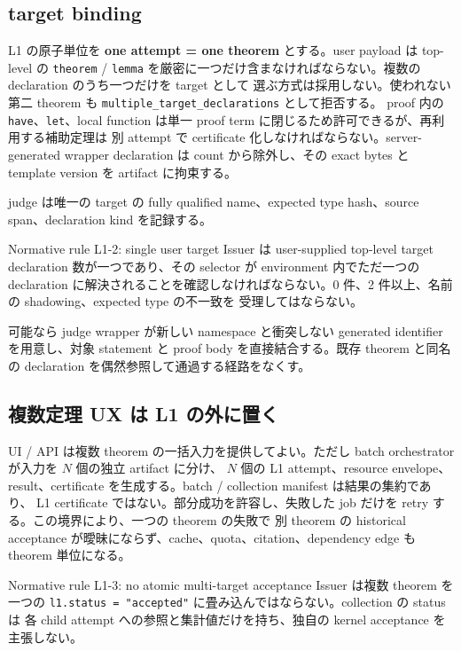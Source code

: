 \documentclass[a4paper,11pt]{ltjsarticle}
\newcommand{\term}[1]{\textbf{\color{TFNavy}#1}}
\newcommand{\code}[1]{\texttt{#1}}
\begin{document}
\subsection{target binding}

L1 の原子単位を \term{one attempt = one theorem} とする。user payload は top-level の
\code{theorem} / \code{lemma} を厳密に一つだけ含まなければならない。複数の declaration のうち一つだけを target として
選ぶ方式は採用しない。使われない第二 theorem も \code{multiple\_target\_declarations} として拒否する。
proof 内の \code{have}、\code{let}、local function は単一 proof term に閉じるため許可できるが、再利用する補助定理は
別 attempt で certificate 化しなければならない。server-generated wrapper declaration は count から除外し、その exact
bytes と template version を artifact に拘束する。

judge は唯一の target の fully qualified name、expected type hash、source span、declaration kind を記録する。

\begin{specbox}{Normative rule L1-2: single user target}
Issuer は user-supplied top-level target declaration 数が一つであり、その selector が environment 内でただ一つの
declaration に解決されることを確認しなければならない。0 件、2 件以上、名前の shadowing、expected type の不一致を
受理してはならない。
\end{specbox}

可能なら judge wrapper が新しい namespace と衝突しない generated identifier を用意し、対象 statement と
proof body を直接結合する。既存 theorem と同名の declaration を偶然参照して通過する経路をなくす。

\subsection{複数定理 UX は L1 の外に置く}

UI / API は複数 theorem の一括入力を提供してよい。ただし batch orchestrator が入力を $N$ 個の独立 artifact に分け、
$N$ 個の L1 attempt、resource envelope、result、certificate を生成する。batch / collection manifest は結果の集約であり、
L1 certificate ではない。部分成功を許容し、失敗した job だけを retry する。この境界により、一つの theorem の失敗で
別 theorem の historical acceptance が曖昧にならず、cache、quota、citation、dependency edge も theorem 単位になる。

\begin{specbox}{Normative rule L1-3: no atomic multi-target acceptance}
Issuer は複数 theorem を一つの \code{l1.status = "accepted"} に畳み込んではならない。collection の status は
各 child attempt への参照と集計値だけを持ち、独自の kernel acceptance を主張しない。
\end{specbox}
\end{document}

